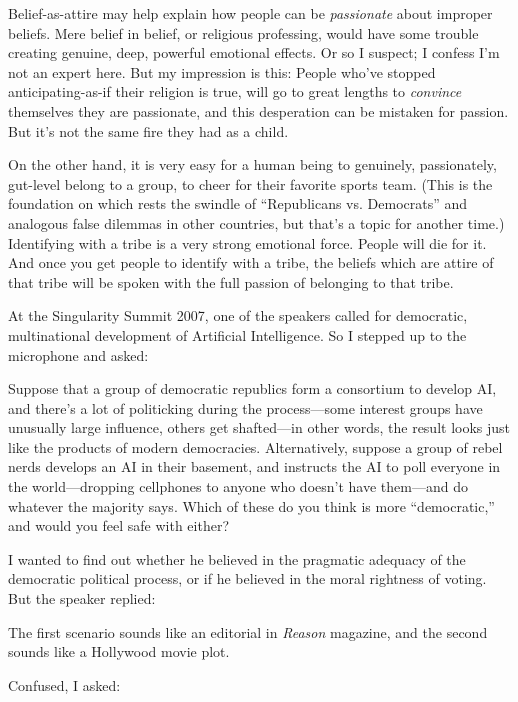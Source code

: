 {
 Belief-as-attire may help explain how people can be
\textit{passionate} about improper beliefs. Mere belief in belief, or
religious professing, would have some trouble creating genuine, deep,
powerful emotional effects. Or so I suspect; I confess
I'm not an expert here. But my impression is this:
People who've stopped anticipating-as-if their religion
is true, will go to great lengths to \textit{convince} themselves they
are passionate, and this desperation can be mistaken for passion. But
it's not the same fire they had as a child.}

{
 On the other hand, it is very easy for a human being to genuinely,
passionately, gut-level belong to a group, to cheer for their favorite
sports team. (This is the foundation on which rests the swindle of
``Republicans vs. Democrats'' and
analogous false dilemmas in other countries, but that's
a topic for another time.) Identifying with a tribe is a very strong
emotional force. People will die for it. And once you get people to
identify with a tribe, the beliefs which are attire of that tribe will
be spoken with the full passion of belonging to that tribe.}

\myendsectiontext


{
 At the Singularity Summit 2007, one of the speakers called for
democratic, multinational development of Artificial Intelligence. So I
stepped up to the microphone and asked:}

{
 Suppose that a group of democratic republics form a consortium to
develop AI, and there's a lot of politicking during the
process---some interest groups have unusually large influence, others
get shafted---in other words, the result looks just like the products
of modern democracies. Alternatively, suppose a group of rebel nerds
develops an AI in their basement, and instructs the AI to poll everyone
in the world---dropping cellphones to anyone who
doesn't have them---and do whatever the majority says.
Which of these do you think is more
``democratic,'' and would you feel
safe with either?}

{
 I wanted to find out whether he believed in the pragmatic adequacy
of the democratic political process, or if he believed in the moral
rightness of voting. But the speaker replied:}

{
 The first scenario sounds like an editorial in \textit{Reason}
magazine, and the second sounds like a Hollywood movie plot.}

{
 Confused, I asked:}

